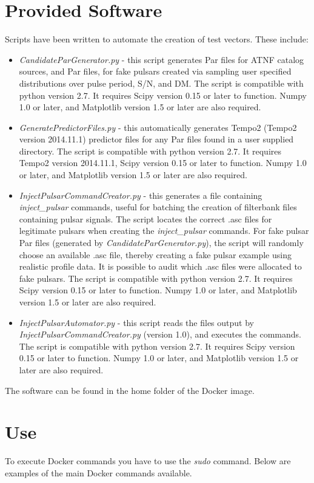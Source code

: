 \documentclass[preprint,authoryear,5p,twocolumn]{elsarticle_mod}
\begin{document}
\section{Provided Software}
Scripts have been written to automate the creation of test vectors. These include: 
\begin{itemize}
\item \textit{CandidateParGenerator.py} - this script generates Par files for ATNF catalog sources, and Par files, for fake pulsars created via sampling user specified distributions over pulse period, S/N, and DM. The script is compatible with python version 2.7. It requires Scipy version 0.15 or later to function. Numpy 1.0 or later, and Matplotlib version 1.5 or later are also required.
\item \textit{GeneratePredictorFiles.py} - this automatically generates Tempo2 (Tempo2 version 2014.11.1) predictor files for any Par files found in a user supplied directory. The script is compatible with python version 2.7.  It requires Tempo2 version 2014.11.1, Scipy version 0.15 or later to function. Numpy 1.0 or later, and Matplotlib version 1.5 or later are also required.
\item \textit{InjectPulsarCommandCreator.py} - this generates a file containing \textit{inject\_pulsar} commands, useful for batching the creation of filterbank files containing pulsar signals. The script locates the correct .asc files for legitimate pulsars when creating the \textit{inject\_pulsar} commands. For fake pulsar Par files (generated by \textit{CandidateParGenerator.py}), the script will randomly choose an available .asc file, thereby creating a fake pulsar example using realistic profile data. It is possible to audit which .asc files were allocated to fake pulsars. The script is compatible with python version 2.7.  It requires Scipy version 0.15 or later to function. Numpy 1.0 or later, and Matplotlib version 1.5 or later are also required. 
\item \textit{InjectPulsarAutomator.py} - this script reads the files output by \textit{InjectPulsarCommandCreator.py} (version 1.0), and executes the commands. The script is compatible with python version 2.7.  It requires Scipy version 0.15 or later to function. Numpy 1.0 or later, and Matplotlib version 1.5 or later are also required. 
\end{itemize}
The software can be found in the home folder of the Docker image. 

\section{Use}
To execute Docker commands you have to use the \textit{sudo} command. Below are examples of the main Docker commands available.\newline
 
\end{document}
